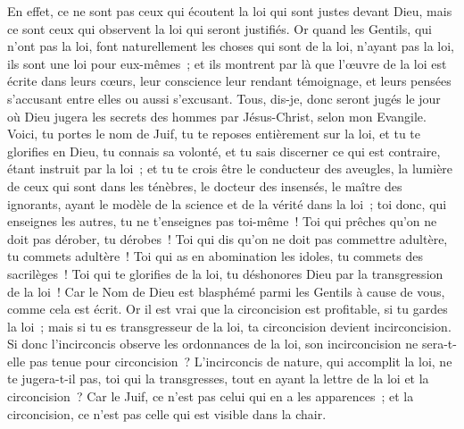\begin{multicols}{2}
En effet, ce ne sont pas ceux qui écoutent la loi qui sont justes devant Dieu, mais ce sont ceux qui observent la loi qui seront justifiés.
Or quand les Gentils, qui n'ont pas la loi, font naturellement les choses qui sont de la loi, n'ayant pas la loi, ils sont une loi pour eux-mêmes~;
et ils montrent par là que l'œuvre de la loi est écrite dans leurs cœurs, leur conscience leur rendant témoignage, et leurs pensées s'accusant entre elles ou aussi s'excusant.
Tous, dis-je, donc seront jugés le jour où Dieu jugera les secrets des hommes par Jésus-Christ, selon mon Evangile.
Voici, tu portes le nom de Juif, tu te reposes entièrement sur la loi, et tu te glorifies en Dieu,
tu connais sa volonté, et tu sais discerner ce qui est contraire, étant instruit par la loi~;
et tu te crois être le conducteur des aveugles, la lumière de ceux qui sont dans les ténèbres,
le docteur des insensés, le maître des ignorants, ayant le modèle de la science et de la vérité dans la loi~;
toi donc, qui enseignes les autres, tu ne t'enseignes pas toi-même~! Toi qui prêches qu'on ne doit pas dérober, tu dérobes~!
Toi qui dis qu'on ne doit pas commettre adultère, tu commets adultère~! Toi qui as en abomination les idoles, tu commets des sacrilèges~!
Toi qui te glorifies de la loi, tu déshonores Dieu par la transgression de la loi~!
Car le Nom de Dieu est blasphémé parmi les Gentils à cause de vous, comme cela est écrit.
Or il est vrai que la circoncision est profitable, si tu gardes la loi~; mais si tu es transgresseur de la loi, ta circoncision devient incirconcision.
Si donc l'incirconcis observe les ordonnances de la loi, son incirconcision ne sera-t-elle pas tenue pour circoncision~?
L'incirconcis de nature, qui accomplit la loi, ne te jugera-t-il pas, toi qui la transgresses, tout en ayant la lettre de la loi et la circoncision~?
Car le Juif, ce n'est pas celui qui en a les apparences~; et la circoncision, ce n'est pas celle qui est visible dans la chair.

\end{multicols}
